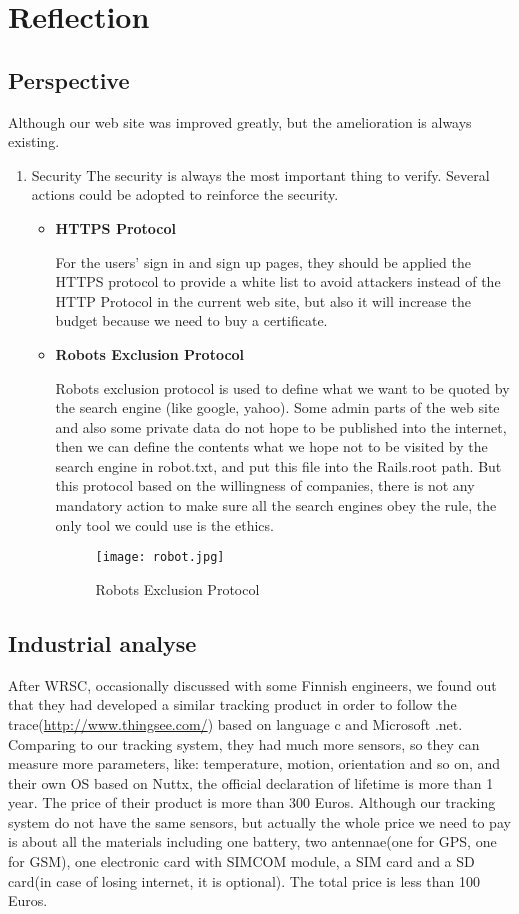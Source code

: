 \section{Reflection}
\subsection{Perspective}
Although our web site was improved greatly, but the amelioration is always existing.
\begin{enumerate}
\item{Security}
The security is always the most important thing to verify. Several actions could be adopted to reinforce the security.
\begin{itemize}
\item{\textbf{HTTPS Protocol}}

For the users' sign in and sign up pages, they should be applied the HTTPS protocol to provide a white list to avoid attackers instead of the HTTP Protocol in the current web site, but also it will increase the budget because we need to buy a certificate.

\item{\textbf{Robots Exclusion Protocol}}

Robots exclusion protocol is used to define what we want to be quoted by the search engine (like google, yahoo). Some admin parts of the web site and also some private data do not hope to be published into the internet, then we can define the contents what we hope not to be visited by the search engine in robot.txt, and put this file into the Rails.root path. But this protocol based on the willingness of companies, there is not any mandatory action to make sure all the search engines obey the rule, the only tool we could use is the ethics.
\begin{figure}[h!]
    \centering
    \texttt{[image: robot.jpg]}
    \caption{Robots Exclusion Protocol }
    \label{fig-sample}
\end{figure} 
\end{itemize} 
\end{enumerate}
\subsection{Industrial analyse}
After WRSC, occasionally discussed with some Finnish engineers, we found out that they had developed a similar tracking product in order to follow the trace(\url{http://www.thingsee.com/}) based on language c  and Microsoft .net. Comparing to our tracking system, they had much more sensors, so they can measure more parameters, like: temperature, motion, orientation and so on, and their own OS based on Nuttx, the official declaration of lifetime is more than 1 year. The price of their product is more than 300 Euros. Although our tracking system do not have the same sensors, but actually the whole price we need to pay is about all the materials including one battery, two antennae(one for GPS, one for GSM), one electronic card with SIMCOM module, a SIM card and a SD card(in case of losing internet, it is optional). The total price is less than 100 Euros.

